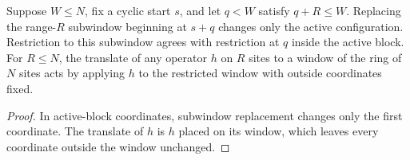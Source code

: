 \begin{lemma}
    \label{lem:open_interaction_subwindow_coordinates}
    \leanok
    Suppose $W\leq N$, fix a cyclic start $s$, and let $q<W$ satisfy
    $q+R\leq W$. Replacing the range-$R$ subwindow beginning at $s+q$
    changes only the active configuration. Restriction to this subwindow
    agrees with restriction at $q$ inside the active block. For $R\leq N$,
    the translate of any operator $h$ on $R$ sites to a window of the ring
    of $N$ sites acts by applying $h$ to the restricted window with outside
    coordinates fixed.
\end{lemma}
\begin{proof}\leanok
    In active-block coordinates, subwindow replacement changes only the
    first coordinate. The translate of $h$ is $h$ placed on its window,
    which leaves every coordinate outside the window unchanged.
\end{proof}

